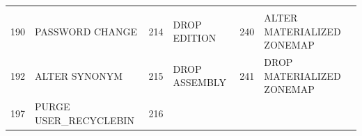 \begin{appendix}
\begin{longtable}[]{@{}rl|rl|rl@{}}
\begin{minipage}[t]{0.24\columnwidth}
\end{minipage}\tabularnewline
\begin{minipage}[t]{0.06\columnwidth}\raggedright\strut
190\strut
\end{minipage} & \begin{minipage}[t]{0.19\columnwidth}\raggedright\strut
PASSWORD CHANGE\strut
\end{minipage} & \begin{minipage}[t]{0.06\columnwidth}\raggedright\strut
214\strut
\end{minipage} & \begin{minipage}[t]{0.24\columnwidth}\raggedright\strut
DROP EDITION\strut
\end{minipage} & \begin{minipage}[t]{0.06\columnwidth}\raggedright\strut
240\strut
\end{minipage} & \begin{minipage}[t]{0.24\columnwidth}\raggedright\strut
ALTER MATERIALIZED ZONEMAP\strut
\end{minipage}\tabularnewline
\begin{minipage}[t]{0.06\columnwidth}\raggedright\strut
192\strut
\end{minipage} & \begin{minipage}[t]{0.19\columnwidth}\raggedright\strut
ALTER SYNONYM\strut
\end{minipage} & \begin{minipage}[t]{0.06\columnwidth}\raggedright\strut
215\strut
\end{minipage} & \begin{minipage}[t]{0.24\columnwidth}\raggedright\strut
DROP ASSEMBLY\strut
\end{minipage} & \begin{minipage}[t]{0.06\columnwidth}\raggedright\strut
241\strut
\end{minipage} & \begin{minipage}[t]{0.24\columnwidth}\raggedright\strut
DROP MATERIALIZED ZONEMAP\strut
\end{minipage}\tabularnewline
\begin{minipage}[t]{0.06\columnwidth}\raggedright\strut
197\strut
\end{minipage} & \begin{minipage}[t]{0.19\columnwidth}\raggedright\strut
PURGE USER\_RECYCLEBIN\strut
\end{minipage} & \begin{minipage}[t]{0.06\columnwidth}\raggedright\strut
216\strut
\end{minipage} & \begin{minipage}[t]{0.24\columnwidth}\raggedright\strut

\end{minipage}
\end{longtable}
\end{appendix}

